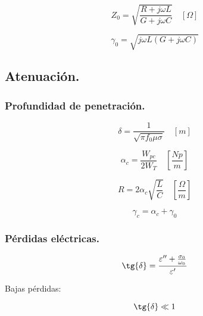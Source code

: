 \documentclass[12pt,a4paper]{article}
\begin{document}
\[ Z_0 = \sqrt{\frac{R + j \omega L}{G + j \omega C}} \quad [\Omega] \]

\[ \gamma_0 =  \sqrt{j \omega L (G + j \omega C )} \]

\subsection{Atenuación.}
\label{sub:atenuacion}

\subsubsection{Profundidad de penetración.}
\label{ssub:profundidad_de_penetracion}

\[ \delta = \frac{1}{\sqrt{\pi f_0 \mu \sigma}} \quad [m] \]

\[ \alpha_c = \frac{W_{pc}}{2 W_T} \quad \left[ \frac{Np}{m} \right] \]

\[ R = 2 \alpha_c \sqrt{\frac{L}{C}} \quad \left[ \frac{\Omega}{m} \right] \]

\[ \gamma_c = \alpha_c + \gamma_0 \]

\subsubsection{Pérdidas eléctricas.}
\label{ssub:perdidas_electricas}

\[ \tg{\delta} = \frac{\varepsilon^{\prime\prime} + \frac{\sigma_0}{\omega_0}}{\varepsilon^{\prime}} \]

Bajas pérdidas:

\[ \tg{\delta} \ll 1 \]
\end{document}
